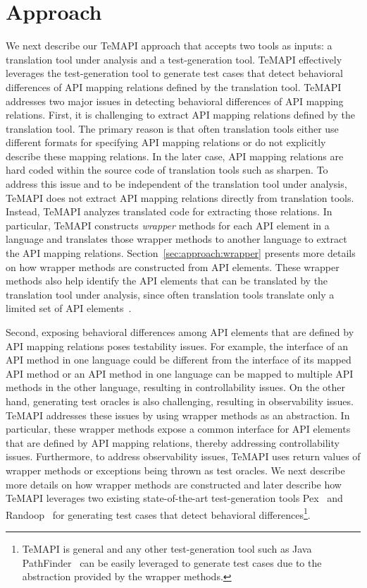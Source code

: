 \section{Approach}
\label{sec:approach}

We next describe our TeMAPI approach that accepts two tools as inputs: a translation tool under analysis and a test-generation tool. TeMAPI effectively leverages the test-generation tool to generate test cases that detect behavioral differences of API mapping relations defined by the translation tool. TeMAPI addresses two major issues in detecting behavioral differences of API mapping relations. First, it is challenging to extract API mapping relations defined by the translation tool. The primary reason is that often translation tools either use different formats for specifying API mapping relations or do not explicitly describe these mapping relations. In the later case, API mapping relations are hard coded within the source code of translation tools such as sharpen. To address this issue and to be independent of the translation tool under analysis, TeMAPI does not extract API mapping relations directly from translation tools. Instead, TeMAPI analyzes translated code for extracting those relations. In particular, TeMAPI constructs \emph{wrapper} methods for each API element in a language and translates those wrapper methods to another language to extract the API mapping relations. Section~\ref{sec:approach:wrapper} presents more details on how wrapper methods are constructed from API elements. These wrapper methods also help identify the API elements that can be translated by the translation tool under analysis, since often translation tools translate only a limited set of API elements~\cite{zhong2010mining}.

Second, exposing behavioral differences among API elements that are defined by API mapping relations poses testability issues. For example, the interface of an API method in one language could be different from the interface of its mapped API method or an API method in one language can be mapped to multiple API methods in the other language, resulting in controllability issues. On the other hand, generating test oracles is also challenging, resulting in observability issues. TeMAPI addresses these issues by using wrapper methods as an abstraction. In particular, these wrapper methods expose a common interface for API elements that are defined by API mapping relations, thereby addressing controllability issues. Furthermore, to address observability issues, TeMAPI uses return values of wrapper methods or exceptions being thrown as test oracles. We next describe more details on how wrapper methods are constructed and later describe how TeMAPI leverages two existing state-of-the-art test-generation tools Pex~\cite{tillmann2008pex} and Randoop~\cite{pacheco2007feedback} for generating test cases that detect behavioral differences\footnote{TeMAPI is general and any other test-generation tool such as Java PathFinder~\cite{DBLP:conf/tacas/AnandPV07} can be easily leveraged to generate test cases due to the abstraction provided by the wrapper methods.}.

